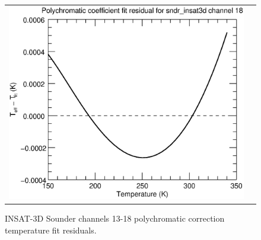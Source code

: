 \begin{figure}[H]
\begin{tabular}{c c}
    \includegraphics[scale=0.35]{graphics/sndr/tfit/sndr_insat3d-18.tfit.eps} \\
  \end{tabular}
  \caption{INSAT-3D Sounder channels 13-18 polychromatic correction temperature fit residuals.}
  \label{fig:sndr_ch13-18_tfit}
\end{figure}
